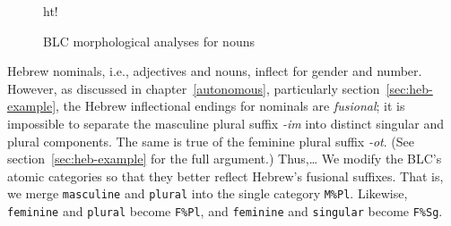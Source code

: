 \begin{figure}{ht!}
\begin{mdframed}
\begin{tabbing}
\end{tabbing}
\caption{BLC morphological analyses for nouns}
\label{fig:blc-nouns}
\end{mdframed}
\end{figure}

Hebrew nominals, i.e., adjectives and nouns, inflect for gender and number. However, as discussed in chapter~\ref{autonomous}, particularly section~\ref{sec:heb-example}, the Hebrew inflectional endings for nominals are \emph{fusional}; it is impossible to separate the  masculine plural suffix \textit{-im} into 
distinct singular and plural components. The same is true of the feminine plural suffix \textit{-ot}. (See section~\ref{sec:heb-example} for the full argument.)  Thus,\dots
We modify the BLC's atomic categories so that they better reflect Hebrew's fusional suffixes. That is, we merge \texttt{masculine} and \texttt{plural} into the single category \texttt{M\%Pl}. Likewise, \texttt{feminine} and \texttt{plural} become \texttt{F\%Pl}, and \texttt{feminine} and \texttt{singular} become \texttt{F\%Sg}.


